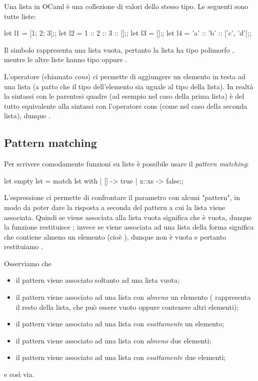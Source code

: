 Una lista in OCaml è una collezione di valori dello stesso tipo. Le seguenti sono tutte liste:
\begin{OCaml}
    let l1 = [1; 2; 3];;
    let l2 = 1 :: 2 :: 3 :: [];;
    let l3 = [];;
    let l4 = 'a' :: 'b' :: ['c', 'd'];;
\end{OCaml}
Il simbolo \InlineOCaml{[]} rappresenta una lista vuota, pertanto la lista  ha tipo polimorfo , mentre le altre liste hanno tipo  oppure .

L'operatore \InlineOCaml{::} (chiamato \emph{cons}) ci permette di aggiungere un elemento in testa ad una lista (a patto che il tipo dell'elemento sia uguale al tipo della lista). In realtà la sintassi con le parentesi quadre (ad esempio nel caso della prima lista) è del tutto equivalente alla sintassi con l'operatore cons (come nel caso della seconda lista), dunque .

\subsection*{Pattern matching}
Per scrivere comodamente funzioni su liste è possibile usare il \emph{pattern matching}:
\begin{OCaml}
    let empty lst = 
        match lst with
        | []    -> true
        | x::xs -> false;;
\end{OCaml}
L'espressione  ci permette di confrontare il parametro  con alcuni "pattern", in modo da poter dare la risposta a seconda del pattern a cui la lista viene associata. Quindi se  viene associata alla lista vuota \InlineOCaml{[]} significa che  è vuota, dunque la funzione  restituisce ; invece se  viene associata ad una lista della forma  significa che  contiene almeno un elemento (cioè ), dunque non è vuota e pertanto restituiamo .

Osserviamo che \begin{itemize}
    \item il pattern \InlineOCaml{[]} viene associato soltanto ad una lista vuota;
    \item il pattern  viene associato ad una lista con \emph{almeno} un elemento ( rappresenta il resto della lista, che può essere vuoto oppure contenere altri elementi);
    \item il pattern  viene associato ad una lista con \emph{esattamente} un elemento;
    \item il pattern  viene associato ad una lista con \emph{almeno} due elementi;
    \item il pattern  viene associato ad una lista con \emph{esattamente} due elementi;
\end{itemize} e così via.

